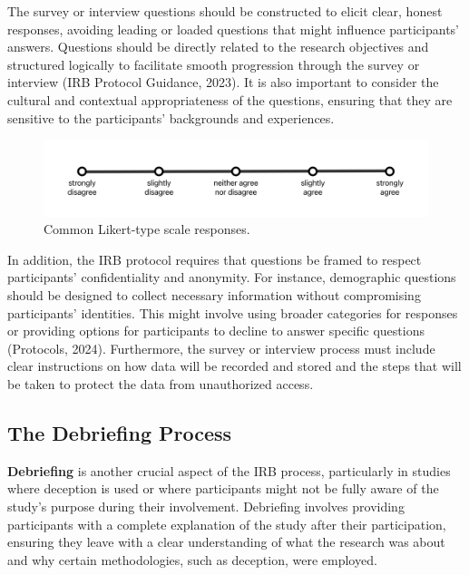 \documentclass[
]{book}
\begin{document}
The survey or interview questions should be constructed to elicit clear, honest responses, avoiding leading or loaded questions that might influence participants' answers. Questions should be directly related to the research objectives and structured logically to facilitate smooth progression through the survey or interview (IRB Protocol Guidance, 2023). It is also important to consider the cultural and contextual appropriateness of the questions, ensuring that they are sensitive to the participants' backgrounds and experiences.

\begin{figure}
\centering
\includegraphics[width=1\textwidth,height=\textheight]{images/likert-scale.png}
\caption{Common Likert-type scale responses.}
\end{figure}

In addition, the IRB protocol requires that questions be framed to respect participants' confidentiality and anonymity. For instance, demographic questions should be designed to collect necessary information without compromising participants' identities. This might involve using broader categories for responses or providing options for participants to decline to answer specific questions (Protocols, 2024). Furthermore, the survey or interview process must include clear instructions on how data will be recorded and stored and the steps that will be taken to protect the data from unauthorized access.

\subsection*{The Debriefing Process}\label{the-debriefing-process}

\textbf{Debriefing} is another crucial aspect of the IRB process, particularly in studies where deception is used or where participants might not be fully aware of the study's purpose during their involvement. Debriefing involves providing participants with a complete explanation of the study after their participation, ensuring they leave with a clear understanding of what the research was about and why certain methodologies, such as deception, were employed.
\end{document}
